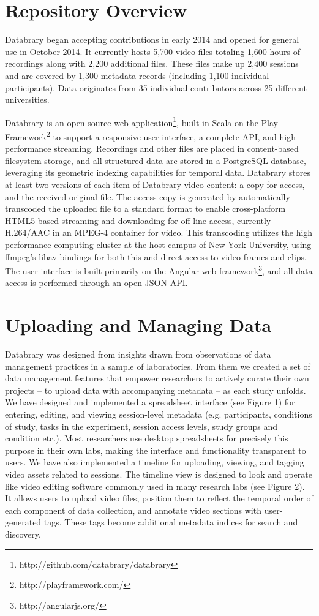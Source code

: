 \documentclass{sig-alternate}
\begin{document}
\section{Repository Overview}
Databrary began accepting contributions in early 2014 and opened for general use in October 2014.
It currently hosts 5,700 video files totaling 1,600 hours of recordings along with 2,200 additional files.
These files make up 2,400 sessions and are covered by 1,300 metadata records (including 1,100 individual participants).
Data originates from 35 individual contributors across 25 different universities.

Databrary is an open-source web application\footnote{http://github.com/databrary/databrary}, built in Scala on the Play Framework\footnote{http://playframework.com/} to support a responsive user interface, a complete API, and high-performance streaming.
Recordings and other files are placed in content-based filesystem storage, and all structured data are stored in a PostgreSQL database, leveraging its geometric indexing capabilities for temporal data.
Databrary stores at least two versions of each item of Databrary video content: a copy for access, and the received original file.
The access copy is generated by automatically transcoded the uploaded file to a standard format to enable cross-platform HTML5-based streaming and downloading for off-line access, currently H.264/AAC in an MPEG-4 container for video.
This transcoding utilizes the high performance computing cluster at the host campus of New York University, using ffmpeg's libav bindings for both this and direct access to video frames and clips.
The user interface is built primarily on the Angular web framework\footnote{http://angularjs.org/}, and all data access is performed through an open JSON API.

\section{Uploading and Managing Data}

Databrary was designed from insights drawn from observations of data management practices in a sample of laboratories. 
From them we created a set of data management features that empower researchers to actively curate their own projects – to upload data with accompanying metadata – as each study unfolds. 
We have designed and implemented a spreadsheet interface (see Figure 1) for entering, editing, and viewing session-level metadata (e.g. participants, conditions of study, tasks in the experiment, session access levels, study groups and condition etc.). 
Most researchers use desktop spreadsheets for precisely this purpose in their own labs, making the interface and functionality transparent to users. 
We have also implemented a timeline for uploading, viewing, and tagging video assets related to sessions.  The timeline view is designed to look and operate like video editing software commonly used in many research labs (see Figure 2).
It allows users to upload video files, position them to reflect the temporal order of each component of data collection, and annotate video sections with user-generated tags. 
These tags become additional metadata indices for search and discovery. 
\end{document}
